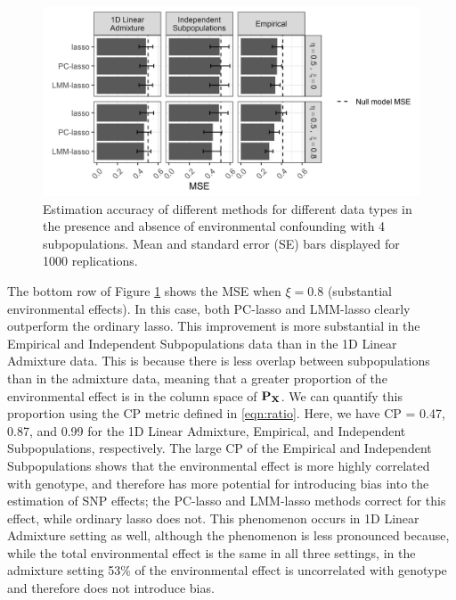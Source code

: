 \begin{figure}[H]
    \centering
    \includegraphics[width = \textwidth]{figures/figure_01.png}
    \caption{Estimation accuracy of different methods for different data types in the presence and absence of environmental confounding with 4 subpopulations. Mean and standard error (SE) bars displayed for 1000 replications.}
    \label{fig:mse}
\end{figure}

The bottom row of Figure \ref{fig:mse} shows the MSE when $\xi = 0.8$ (substantial environmental effects). In this case, both PC-lasso and LMM-lasso clearly outperform the ordinary lasso. This improvement is more substantial in the Empirical and Independent Subpopulations data than in the 1D Linear Admixture data. This is because there is less overlap between subpopulations than in the admixture data, meaning that a greater proportion of the environmental effect is in the column space of $\mathbf{P}_{\mathbf{X}}$. We can quantify this proportion using the CP metric defined in \eqref{eqn:ratio}. Here, we have CP = 0.47, 0.87, and 0.99 for the 1D Linear Admixture, Empirical, and Independent Subpopulations, respectively. The large CP of the Empirical and Independent Subpopulations shows that the environmental effect is more highly correlated with genotype, and therefore has more potential for introducing bias into the estimation of SNP effects; the PC-lasso and LMM-lasso methods correct for this effect, while ordinary lasso does not.  This phenomenon occurs in 1D Linear Admixture setting as well, although the phenomenon is less pronounced because, while the total environmental effect is the same in all three settings, in the admixture setting 53\% of the environmental effect is uncorrelated with genotype and therefore does not introduce bias.

